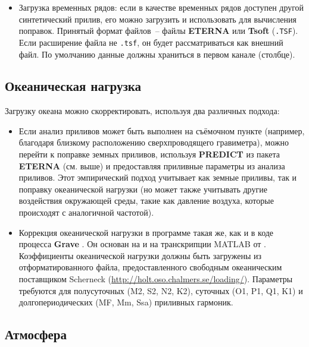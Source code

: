 \begin{itemize}
    \item Загрузка временных рядов: если в качестве временных рядов доступен
    другой синтетический прилив, его можно загрузить и использовать для  
    вычисления поправок. Принятый формат файлов~-- файлы \textbf{ETERNA} или
    \textbf{Tsoft} (\verb|.TSF|). Если расширение файла не \verb|.tsf|, он будет
    рассматриваться как внешний файл. По умолчанию данные должны храниться в
    первом канале (столбце).
    
\end{itemize}

\subsection[Океаническая нагрузка]{Океаническая нагрузка}
\label{subsec:ocean_loading}

Загрузку океана можно скорректировать, используя два различных подхода:
\begin{itemize}
    \item Если анализ приливов может быть выполнен на съёмочном пункте
    (например, благодаря близкому расположению сверхпроводящего гравиметра),
    можно перейти к поправке земных приливов, используя
    \textbf{\textsf{PREDICT}} из пакета \textbf{\textsf{ETERNA}} (см. выше) и
    предоставляя приливные параметры из анализа приливов. Этот эмпирический
    подход учитывает как земные приливы, так и поправку океанической нагрузки
    (но может также учитывать другие воздействия окружающей среды, такие как
    давление воздуха, которые происходят с аналогичной частотой).
    
    \item Коррекция океанической нагрузки в программе \pg{} такая же, как и в
    коде процесса \textbf{\textsf{Grave}} \cite{cattin_gravprocess_2015}. Он
    основан на \cite{agnew_2012} и на транскрипции MATLAB\texttrademark{} от
    \cite{cattin_gravprocess_2015}. Коэффициенты океанической нагрузки должны
    быть загружены из отформатированного файла, предоставленного свободным
    океаническим поставщиком Scherneck
    (\url{http://holt.oso.chalmers.se/loading/}). Параметры требуются для
    полусуточных (M2, S2, N2, K2), суточных (O1, P1, Q1, K1) и
    долгопериодических (MF, Mm, Ssa) приливных гармоник.
\end{itemize}

\subsection[Атмосфера]{Атмосфера}
\label{subsec:atmosphere}

